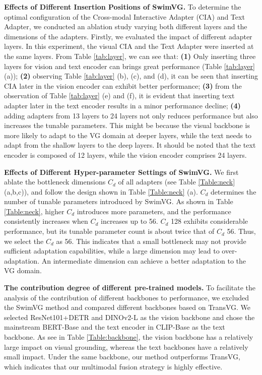 \noindent
\textbf{Effects of Different Insertion Positions of SwimVG.} To determine the optimal configuration of the Cross-modal Interactive Adapter (CIA) and Text Adapter, we conducted an ablation study varying both different layers and the dimensions of the adapters. Firstly, we evaluated the impact of different adapter layers. In this experiment, the visual CIA and the Text Adapter were inserted at the same layers. From Table \ref{tab:layer}, we can see that: \textbf{(1)} Only inserting three layers for vision and text encoder can brings great performance (Table \ref{tab:layer} (a)); \textbf{(2)} observing Table \ref{tab:layer} (b), (c), and (d), it can be seen that inserting CIA later in the vision encoder can exhibit better performance; \textbf{(3)} 
from the observation of Table \ref{tab:layer} (e) and (f), it is evident that inserting text adapter later in the text encoder results in a minor performance decline; \textbf{(4)} 
adding adapters from 13 layers to 24 layers not only reduces performance but also increases the tunable parameters. This might be because the visual backbone is more likely to adapt to the VG domain at deeper layers, while the text needs to adapt from the shallow layers to the deep layers. It should be noted that the text encoder is composed of 12 layers, while the vision encoder comprises 24 layers.






\noindent
\textbf{Effects of Different Hyper-parameter Settings of SwimVG.} We first ablate the bottleneck dimensions $C_d$ of all adapters (see Table \ref{Table:neck} (a,b,c)), and follow the design shown in Table \ref{Table:neck} (a). $C_d$ determines the number of tunable parameters introduced by SwimVG. As shown in Table \ref{Table:neck}, higher $C_d$ introduces more parameters, and the performance consistently increases when $C_d$ increases up to 56. $C_d$ 128 exhibits considerable performance, but its tunable parameter count is about twice that of $C_d$ 56. Thus, we select the $C_d$ as 56. This indicates that a small bottleneck may not provide sufficient adaptation capabilities, while a large dimension may lead to over-adaptation. An intermediate dimension can achieve a better adaptation to the VG domain.



\noindent
\textbf{The contribution degree of different pre-trained models.} To facilitate the analysis of the contribution of different backbones to performance, we excluded the SwimVG method and compared different backbones based on TransVG\cite{deng2021transvg}. We selected ResNet101+DETR and DINOv2-L as the vision backbone and chose the mainstream BERT-Base and the text encoder in CLIP-Base as the text backbone. As see in Table \ref{Table:backbone}, the vision backbone has a relatively large impact on visual grounding, whereas the text backbones have a relatively small impact. Under the same backbone, our method outperforms TransVG, which indicates that our multimodal fusion strategy is highly effective.

